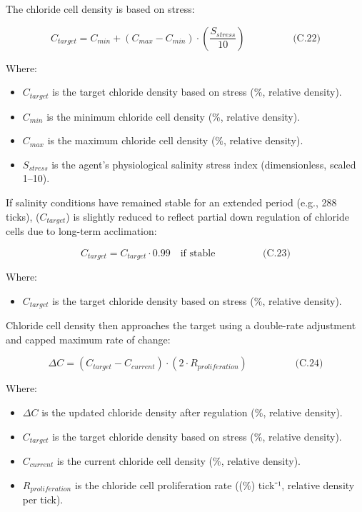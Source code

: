 \documentclass[
]{book}
\providecommand{\tightlist}{%
  \setlength{\itemsep}{0pt}\setlength{\parskip}{0pt}}
\begin{document}
The chloride cell density is based on stress:

\[
\begin{equation} C_{target} = C_{min} + (C_{max} - C_{min}) \cdot \left(\frac{S_{stress}}{10}\right)   \hspace{2cm} \text{(C.22)} \end{equation}
\]

Where:

\begin{itemize}
\tightlist
\item
  \(C_{target}\) is the target chloride density based on stress (\%,
  relative density).
\item
  \(C_{min}\) is the minimum chloride cell density (\%, relative
  density).
\item
  \(C_{max}\) is the maximum chloride cell density (\%, relative
  density).
\item
  \(S_{stress}\) is the agent's physiological salinity stress index
  (dimensionless, scaled 1--10).
\end{itemize}

If salinity conditions have remained stable for an extended period
(e.g., 288 ticks), (\(C_{target}\)) is slightly reduced to reflect partial
down regulation of chloride cells due to long-term acclimation:

\[
\begin{equation} C_{target} = C_{target} \cdot 0.99 \quad \text{if stable}   \hspace{2cm} \text{(C.23)} \end{equation}
\]

Where:

\begin{itemize}
\tightlist
\item
  \(C_{target}\) is the target chloride density based on stress (\%,
  relative density).
\end{itemize}

Chloride cell density then approaches the target using a double-rate
adjustment and capped maximum rate of change:

\[
\begin{equation} \Delta C = \left(C_{target} - C_{current}\right) \cdot \left(2 \cdot R_{proliferation}\right)   \hspace{2cm} \text{(C.24)} \end{equation}
\]

Where:

\begin{itemize}
\tightlist
\item
  \(\Delta C\) is the updated chloride density after regulation (\%,
  relative density).
\item
  \(C_{target}\) is the target chloride density based on stress (\%,
  relative density).
\item
  \(C_{current}\) is the current chloride cell density (\%, relative
  density).
\item
  \(R_{proliferation}\) is the chloride cell proliferation rate ((\%)
  tick⁻¹, relative density per tick).
\end{itemize}
\end{document}
